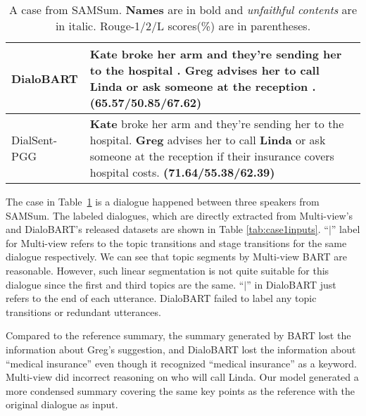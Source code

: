 \begin{table}[th]
\begin{tabular}{lp{4.9cm}}
		\hline
		{DialoBART} &   \textbf{Kate} broke her arm and they're sending her to the hospital . \textbf{Greg} advises her to call \textbf{Linda} or ask someone at the reception .\textbf{(65.57/50.85/67.62)}\\
		
		\hline
		{DialSent-PGG} &\textbf{Kate} broke her arm and they're sending her to the hospital. \textbf{Greg} advises her to call \textbf{Linda} or ask someone at the reception if their insurance covers hospital costs. \textbf{(71.64/55.38/62.39)}\\
		\bottomrule[1pt]
	\end{tabular}
	\caption{A case from SAMSum. \textbf{Names} are in bold and \textit{unfaithful contents} are in italic. Rouge-1/2/L scores(\%) are in parentheses.}
	\label{tab:case1}
\end{table}

The case in Table~\ref{tab:case1} is a dialogue happened between three speakers from SAMSum. 
The labeled dialogues, which are directly extracted from Multi-view's and DialoBART's released datasets are shown in Table \ref{tab:case1inputs}. ``$\mid$'' label for Multi-view refers to the topic transitions and stage transitions for the same dialogue respectively. 
We can see that topic segments by Multi-view BART are reasonable. However, such linear segmentation is not quite suitable for this dialogue since the first and third topics are the same.
``$\mid$'' in DialoBART just refers to the end of each utterance.
DialoBART failed to label any topic transitions or redundant utterances.

Compared to the reference summary, the summary generated by BART lost the information about Greg's suggestion, and DialoBART lost the information about ``medical insurance'' even though it recognized ``medical insurance'' as a keyword.
Multi-view did incorrect reasoning on who will call Linda.
Our model generated a more condensed summary covering the same key points as the reference with the original dialogue as input.

